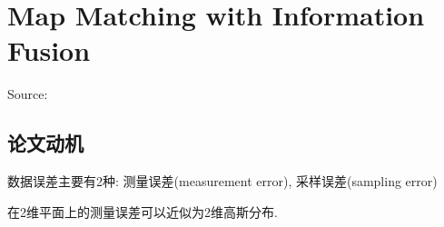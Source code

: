 \chapter{Map Matching with Information Fusion}

Source: \cite{Hu2017}

\section{论文动机}

数据误差主要有2种: 测量误差(measurement error), 采样误差(sampling error)

在2维平面上的测量误差可以近似为2维高斯分布. 